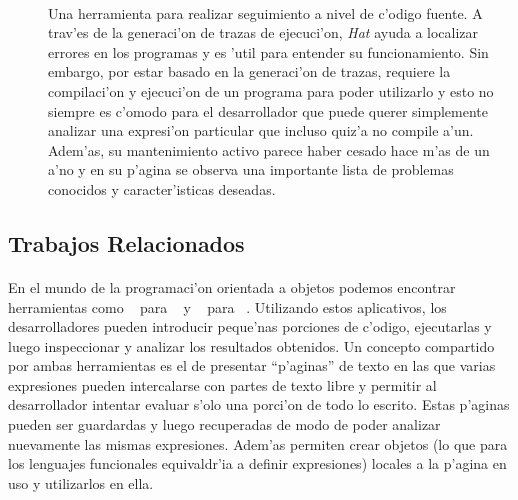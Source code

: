 \documentclass[a4paper]{article}
\begin{document}
\begin{description}
	\item[~\cite{hat}] Una herramienta para realizar seguimiento a nivel de c'odigo fuente.  A trav'es de la generaci'on de trazas de ejecuci'on, \textit{Hat} ayuda a localizar errores en los programas y es 'util para entender su funcionamiento.  Sin embargo, por estar basado en la generaci'on de trazas, requiere la compilaci'on y ejecuci'on de un programa para poder utilizarlo y esto no siempre es c'omodo para el desarrollador que puede querer simplemente analizar una expresi'on particular que incluso quiz'a no compile a'un.  Adem'as, su mantenimiento activo parece haber cesado hace m'as de un a'no y en su p'agina se observa una importante lista de problemas conocidos y caracter'isticas deseadas.
\end{description}

\subsection{Trabajos Relacionados}
\begin{epigraphs}
\end{epigraphs}
\paragraph{}En el mundo de la programaci'on orientada a objetos podemos encontrar herramientas como ~\cite{javascrapbook} para ~\cite{java} y ~\cite{insidesmalltalk, smalltalkworkspace} para ~\cite{smalltalk}.  Utilizando estos aplicativos, los desarrolladores pueden introducir peque'nas porciones de c'odigo, ejecutarlas y luego inspeccionar y analizar los resultados obtenidos.  Un concepto compartido por ambas herramientas es el de presentar ``p'aginas'' de texto en las que varias expresiones pueden intercalarse con partes de texto libre y permitir al desarrollador intentar evaluar s'olo una porci'on de todo lo escrito.  Estas p'aginas pueden ser guardardas y luego recuperadas de modo de poder analizar nuevamente las mismas expresiones.  Adem'as permiten crear objetos (lo que para los lenguajes funcionales equivaldr'ia a definir expresiones) locales a la p'agina en uso y utilizarlos en ella.
\end{document}
